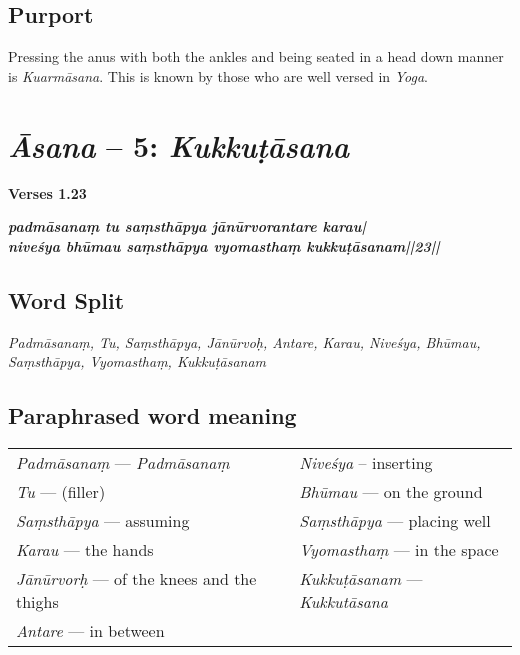 \subsection*{Purport}

Pressing the anus with both the ankles and being seated in a head down manner is \textit{Kuarmāsana}. This is known by those who are well versed in \textit{Yoga}. 

	
\section*{\textit{Āsana} -- 5: \textit{Kukkuṭāsana}}

\noindent 
\textbf{Verses 1.23}

\begin{shloka}
\textit{\textbf{padmāsanaṃ tu saṃsthāpya jānūrvorantare karau|}\\
\textbf{niveśya bhūmau saṃsthāpya vyomasthaṃ kukkuṭāsanam||23||}}
\end{shloka}

\subsection*{Word Split}

\textit{Padmāsanaṃ, Tu, Saṃsthāpya, Jānūrvoḥ, Antare, Karau, Niveśya, Bhūmau, Saṃsthāpya, Vyomasthaṃ, Kukkuṭāsanam}

\subsection*{Paraphrased word meaning}
\vspace{-10pt}

\begin{longtable}{>{\noindent\raggedright}p{5cm}>{\noindent\raggedright}p{5cm}}
\textit{Padmāsanaṃ} --- \textit{Padmāsanaṃ} & \textit{Niveśya} – inserting\tabularnewline
\textit{Tu}  --- (filler) & \textit{Bhūmau} --- on the ground\tabularnewline
\textit{Saṃsthāpya} --- assuming  & \textit{Saṃsthāpya} --- placing well\tabularnewline
\textit{Karau} --- the hands  & \textit{Vyomasthaṃ} --- in the space\tabularnewline
\textit{Jānūrvorḥ} --- of the knees and the thighs  & \textit{Kukkuṭāsanam} --- \textit{Kukkutāsana} \tabularnewline
\textit{Antare} --- in between & 
\end{longtable}



